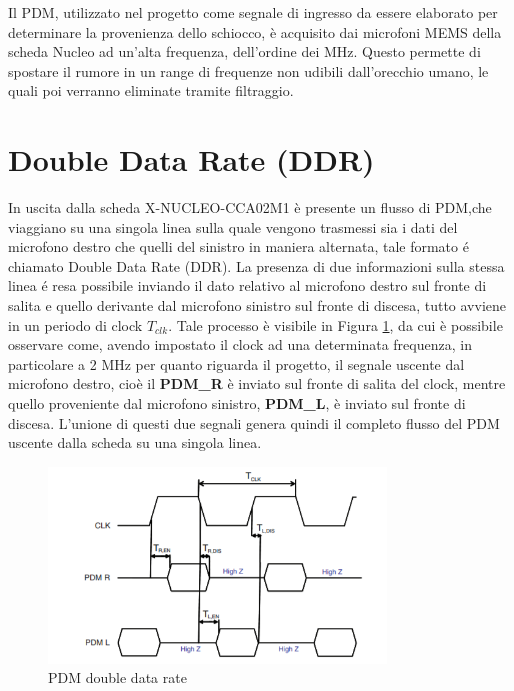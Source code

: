\documentclass[a4paper, titlepage]{article}
\begin{document}
\noindent Il PDM, utilizzato nel progetto come segnale di ingresso da essere elaborato per determinare la provenienza dello schiocco, è acquisito dai microfoni MEMS della scheda Nucleo ad un'alta frequenza, dell'ordine dei MHz. Questo permette di spostare il rumore in un range di frequenze non udibili dall'orecchio umano, le quali poi verranno eliminate tramite filtraggio.

\section{Double Data Rate (DDR)}
In uscita dalla scheda X-NUCLEO-CCA02M1 è presente un flusso di PDM,che viaggiano su una singola linea sulla quale vengono trasmessi sia i dati del microfono destro che quelli del sinistro in maniera alternata, tale formato é chiamato Double Data Rate (DDR).
La presenza di due informazioni sulla stessa linea é resa possibile inviando il dato relativo al microfono destro sul fronte di salita e quello derivante dal microfono sinistro sul fronte di discesa, tutto avviene in un periodo di clock $T_{clk}$.
Tale processo è visibile in Figura \ref{fig:DDR}, da cui è possibile osservare come, avendo impostato il clock ad una determinata frequenza, in particolare a 2 MHz per quanto riguarda il progetto, il segnale uscente dal microfono destro, cioè il \textbf{PDM\_R} è inviato sul fronte di salita del clock, mentre quello proveniente dal microfono sinistro, \textbf{PDM\_L}, è inviato sul fronte di discesa. L'unione di questi due segnali genera quindi il completo flusso del PDM uscente dalla scheda su una singola linea.

\begin{figure}[H]
    \centering
    \includegraphics[width=0.8\textwidth]{DDR.PNG}
    \caption{PDM double data rate}
    \label{fig:DDR}
\end{figure}
\end{document}
